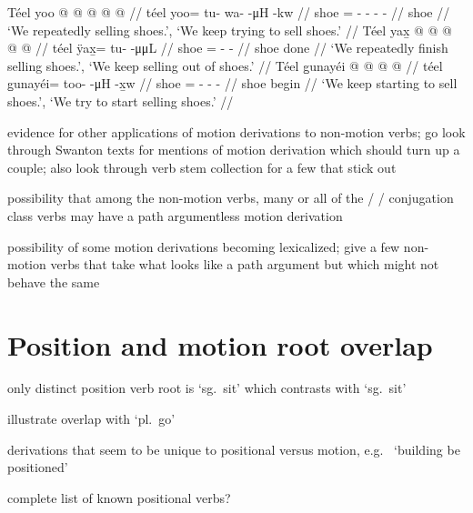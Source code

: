 \documentclass[12pt,letterpaper,oneside,article]{memoir}
\begin{document}
\pex\label{ex:motderiv-beyond-sell-repimpfv}%
\a\label{ex:motderiv-beyond-sell-repimpfv-plain}%
%
\begingl
	\gla	Téel yoo @  @ {} @ {} @ {} @ {} //
	\glb	téel yoo= tu- wa-  -μH -kw //
	\glc	shoe = - -  - - //
	\gld	shoe \•  {} {} {} {} //
	\glft	‘We repeatedly selling shoes.’, ‘We keep trying to sell shoes.’
		//
\endgl
\a\label{ex:motderiv-beyond-sell-impfv-term}%
%
\begingl
	\gla	Téel yax̱ @  @ {} @ {} @ {} @ {} //
	\glb	téel ÿax̱= tu-  -μμL //
	\glc	shoe = -  - //
	\gld	shoe done\·  {} {} {} {} //
	\glft	‘We repeatedly finish selling shoes.’, ‘We keep selling out of shoes.’
		//
\endgl
\a\label{ex:motderiv-beyond-sell-impfv-incep}%
%
\begingl
	\gla	Téel g̱unayéi @  @ {} @ {} @ {} //
	\glb	téel g̱unayéi= too-  -μH -x̱w //
	\glc	shoe = -  - - //
	\gld	shoe begin\·  {} {} {} //
	\glft	‘We keep starting to sell shoes.’, ‘We try to start selling shoes.’
		//
\endgl
\xe



evidence for other applications of motion derivations to non-motion verbs; go look through Swanton texts for mentions of motion derivation which should turn up a couple; also look through verb stem collection for a few that stick out

possibility that among the non-motion verbs, many or all of the  /  /  conjugation class verbs may have a path argumentless motion derivation

possibility of some motion derivations becoming lexicalized; give a few non-motion verbs that take what looks like a path argument but which might not behave the same

\clearpage
\section{Position and motion root overlap}\label{sec:motposroot}

only distinct position verb root is  ‘sg.\ sit’ which contrasts with  ‘sg.\ sit’

illustrate overlap with  ‘pl.\ go’

derivations that seem to be unique to positional versus motion, e.g.\  ‘building be positioned’

complete list of known positional verbs?

\clearpage
\raggedyright
\printbibliography\label{sec:bibliography} 
\end{document}
